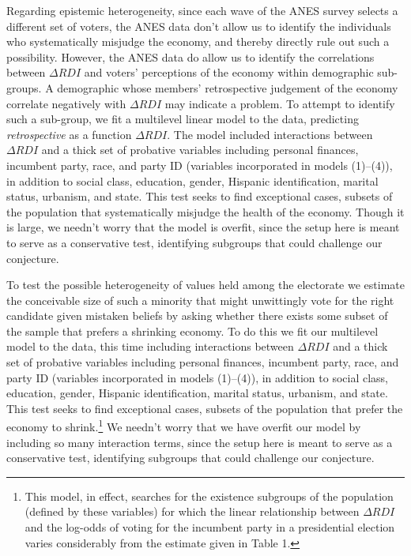 \documentclass[11pt]{article}
\begin{document}
Regarding epistemic heterogeneity, since each wave of the ANES survey selects a different set of voters, the ANES data don't allow us to identify the individuals who
systematically misjudge the economy, and thereby directly rule out
such a possibility.
However, the ANES data do allow us to identify the correlations between
$\Delta RDI$ and voters' perceptions of the economy within demographic
sub-groups.
A demographic whose members' retrospective judgement of the economy
correlate negatively with $\Delta RDI$ may indicate a problem.
To attempt to identify such a sub-group, we fit a multilevel linear model to the
data, predicting \emph{retrospective} as a function $\Delta RDI$.
The model included interactions between $\Delta RDI$ and a thick set of probative variables including personal finances, incumbent party, race, and party ID (variables incorporated in models (1)--(4)), %
in addition to social class, education, gender, Hispanic
identification, marital status, urbanism, and state. This test seeks
to find exceptional cases, subsets of the population that
systematically misjudge the health of the economy.
Though it is large, we needn't worry that the model is overfit, since the setup here is meant to serve as a conservative test, identifying subgroups that could challenge our conjecture.

To test the possible heterogeneity of values held among the electorate we estimate the conceivable size of such a minority that might unwittingly vote for the right candidate given mistaken beliefs by asking whether there exists some subset of the sample that prefers a shrinking economy. %
To do this we fit our multilevel model to the data, this time including interactions between $\Delta RDI$ and a thick set of probative variables including personal finances, incumbent party, race, and party ID (variables incorporated in models (1)--(4)), %
in addition to social class, education, gender, Hispanic identification, marital status, urbanism, and state. This test seeks to find exceptional cases, subsets of the population that prefer the economy to shrink.\footnote{
This model, in effect, searches for the existence subgroups of the population (defined by these variables) for which the linear relationship between $\Delta RDI$ and the log-odds of voting for the incumbent party in a presidential election varies considerably from the estimate given in Table 1.}  We needn't worry that we have overfit our model by including so many interaction terms, since the setup here is meant to serve as a conservative test, identifying subgroups that could challenge our conjecture.
\end{document}
